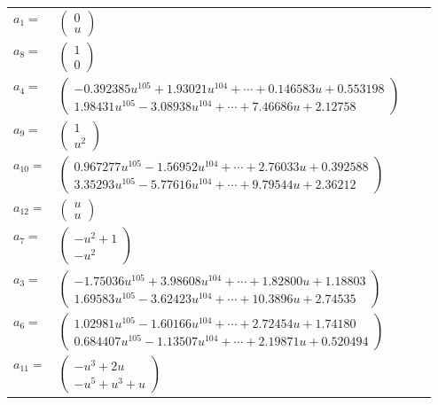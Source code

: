 \documentclass[1p]{elsarticle_modified}
\theoremstyle{definition}
\begin{document}
\begin{tabular}{m{7pt} m{180pt} m{7pt} m{180pt} }
\flushright $a_{1}=$&$\begin{pmatrix}0\\u\end{pmatrix}$ \\
\flushright $a_{8}=$&$\begin{pmatrix}1\\0\end{pmatrix}$ \\
\flushright $a_{4}=$&$\begin{pmatrix}-0.392385 u^{105}+1.93021 u^{104}+\cdots+0.146583 u+0.553198\\1.98431 u^{105}-3.08938 u^{104}+\cdots+7.46686 u+2.12758\end{pmatrix}$ \\
\flushright $a_{9}=$&$\begin{pmatrix}1\\u^2\end{pmatrix}$ \\
\flushright $a_{10}=$&$\begin{pmatrix}0.967277 u^{105}-1.56952 u^{104}+\cdots+2.76033 u+0.392588\\3.35293 u^{105}-5.77616 u^{104}+\cdots+9.79544 u+2.36212\end{pmatrix}$ \\
\flushright $a_{12}=$&$\begin{pmatrix}u\\u\end{pmatrix}$ \\
\flushright $a_{7}=$&$\begin{pmatrix}- u^2+1\\- u^2\end{pmatrix}$ \\
\flushright $a_{3}=$&$\begin{pmatrix}-1.75036 u^{105}+3.98608 u^{104}+\cdots+1.82800 u+1.18803\\1.69583 u^{105}-3.62423 u^{104}+\cdots+10.3896 u+2.74535\end{pmatrix}$ \\
\flushright $a_{6}=$&$\begin{pmatrix}1.02981 u^{105}-1.60166 u^{104}+\cdots+2.72454 u+1.74180\\0.684407 u^{105}-1.13507 u^{104}+\cdots+2.19871 u+0.520494\end{pmatrix}$ \\
\flushright $a_{11}=$&$\begin{pmatrix}- u^3+2 u\\- u^5+u^3+u\end{pmatrix}$ \\

\end{tabular}
\end{document}
